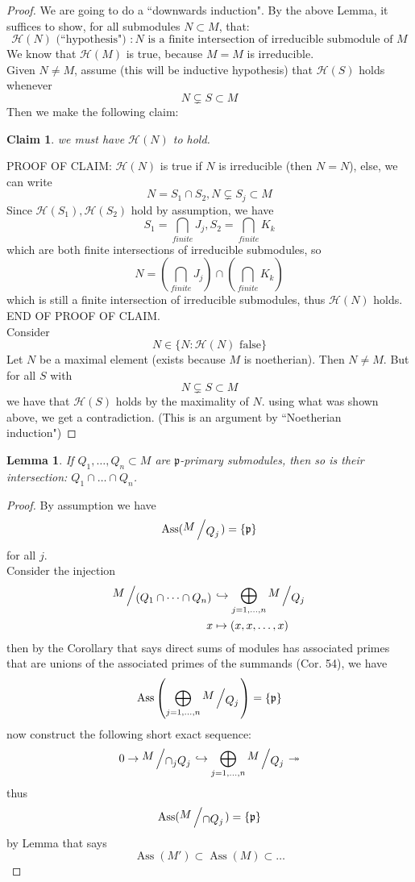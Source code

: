 \documentclass[12pt]{article}
\DeclareMathOperator{\Ass}{Ass}
\newcommand{\bigslant}[2]{{\raisebox{.2em}{$#1$}\left/\raisebox{-.2em}{$#2$}\right.}}
\newcommand{\mappinj}[4]{\begin{align*}
#1 & \hookrightarrow #2\\
#3 & \mapsto #4
\end{align*}}
\def\p{\mathfrak{p}}
\newtheorem{lemma}[theorem]{Lemma}
\newtheorem*{claim}{Claim}
\theoremstyle{definition}
\begin{document}
\begin{proof}
We are going to do a ``downwards induction". By the above Lemma, it suffices to show, for all submodules $N\subset M$, that:
\[
\mathcal{H}(N)\text{ (``hypothesis") }: N \text{  is a finite intersection of irreducible submodule of }M
\]
We know that $\mathcal{H}(M)$ is true, because $M=M$ is irreducible.\\
Given $N\neq M$, assume (this will be inductive hypothesis) that $\mathcal{H}(S)$ holds whenever 
\[
N\subsetneq S \subset M
\]
Then we make the following claim:
\begin{claim}
we must have $\mathcal{H}(N)$ to hold.
\end{claim}
PROOF OF CLAIM: $\mathcal{H}(N)$ is true if $N$ is irreducible (then $N=N$), else, we can write
\[
N = S_1 \cap S_2, N\subsetneq S_j \subset M
\]
Since $\mathcal{H}(S_1), \mathcal{H}(S_2)$ hold by assumption, we have
\[
S_1 = \bigcap_{finite} J_j, S_2 = \bigcap_{finite} K_k
\]
which are both finite intersections of irreducible submodules, so
\[
N = \left(\bigcap_{finite} J_j\right)\cap \left(\bigcap_{finite} K_k\right)
\]
which is still a finite intersection of irreducible submodules, thus $\mathcal{H}(N)$ holds. END OF PROOF OF CLAIM.\\
Consider 
\[
N \in \{N: \mathcal{H}(N)\text{ false}\}
\]
Let $N$ be a maximal element (exists because $M$ is noetherian). Then $N\neq M$. But for all $S$ with 
\[
N \subsetneq S \subset M
\]
we have that $\mathcal{H}(S)$ holds by the maximality of $N$. using what was shown above, we get a contradiction. (This is an argument by ``Noetherian induction")
\end{proof}
\begin{lemma}
If $Q_1,\dots ,Q_n \subset M$ are $\p$-primary submodules, then so is their intersection: $Q_1\cap \dots \cap Q_n$.
\end{lemma}
\begin{proof}
By assumption we have 
\[
\Ass(\bigslant{M}{Q_j}) = \{\p\}
\]
for all $j$.\\
Consider the injection
\[
\mappinj{\bigslant{M}{(Q_1\cap \dots \cap Q_n)}}{\bigoplus_{j=1,\dots, n} \bigslant{M}{Q_j}}{x}{(x,x,\dots, x)}
\]
then by the Corollary that says direct sums of modules has associated primes that are unions of the associated primes of the summands (Cor. 54), we have
\[
\Ass\left(\bigoplus_{j=1,\dots, n} \bigslant{M}{Q_j}\right) = \{\p\}
\]
now construct the following short exact sequence:
\[
0 \rightarrow \bigslant{M}{\cap_j Q_j} \hookrightarrow \bigoplus_{j=1,\dots, n} \bigslant{M}{Q_j} \twoheadrightarrow 
\]
thus 
\[
\Ass(\bigslant{M}{\cap Q_j}) = \{\p\}
\]
by Lemma that says 
\[
\Ass(M') \subset \Ass(M) \subset \dots
\]
\end{proof}
\end{document}
